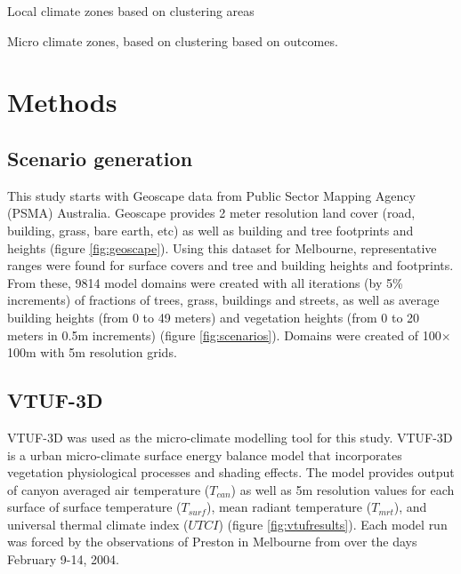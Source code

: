 \documentclass[utf8]{frontiersSCNS} %
\begin{document}

Local climate zones based on clustering areas

Micro climate zones, based on clustering based on outcomes.


\section{Methods}

\subsection{Scenario generation}
This study starts with Geoscape\citep{Geoscape2020} data from Public Sector Mapping Agency (PSMA) Australia. Geoscape provides 2 meter resolution land cover (road, building, grass, bare earth, etc) as well as building and tree footprints and heights (figure \ref{fig:geoscape}). Using this dataset for Melbourne, representative ranges were found for surface covers and tree and building heights and footprints. From these, 9814 model domains were created with all iterations (by 5\% increments) of fractions of trees, grass, buildings and streets, as well as average building heights (from 0 to 49 meters) and vegetation heights (from 0 to 20 meters in 0.5m increments) (figure \ref{fig:scenarios}). Domains were created of 100$\times$100m with 5m resolution grids.

\subsection{VTUF-3D}
VTUF-3D\citep{Nice2018a} was used as the micro-climate modelling tool for this study. VTUF-3D is a urban micro-climate surface energy balance model that incorporates vegetation physiological processes and shading effects. The model provides output of canyon averaged air temperature ($T_{can}$) as well as 5m resolution values for each surface of surface temperature ($T_{surf}$), mean radiant temperature ($T_{mrt}$), and universal thermal climate index ($UTCI$) (figure \ref{fig:vtufresults}). Each model run was forced by the observations of Preston in Melbourne from \cite{Coutts2007} over the days February 9-14, 2004. 
\end{document}

